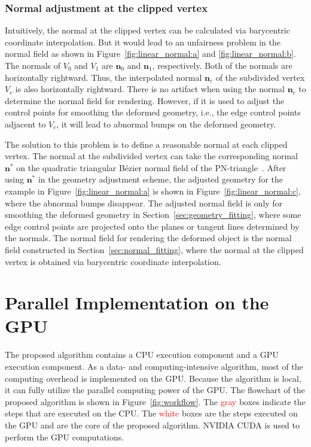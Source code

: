 \documentclass[3p]{elsarticle}
\begin{document}
\subsubsection{Normal adjustment at the clipped vertex}
\label{sec:normal_adjustment}

Intuitively, the normal at the clipped vertex can be calculated via barycentric coordinate interpolation. But it would
lead to an unfairness problem in the normal field as shown in Figure~\ref{fig:linear_normal:a} and
\ref{fig:linear_normal:b}. The normals of $V_0$ and $V_1$ are $\mathbf n_0$ and $\mathbf n_1$, respectively. Both of the
normals are horizontally rightward. Thus, the interpolated normal $\mathbf n_c$ of the subdivided vertex $V_c$ is also
horizontally rightward. There is no artifact when using the normal $\mathbf n_c$ to determine the normal field for
rendering. However, if it is used to adjust the control points for smoothing the deformed geometry, i.e., the edge
control points adjacent to $V_c$, it will lead to abnormal bumps on the deformed geometry.

The solution to this problem is to define a reasonable normal at each clipped vertex. The normal at the subdivided
vertex can take the corresponding normal $\mathbf n^*$ on the quadratic triangular B\'ezier normal field of the
PN-triangle~\cite{Vlachos01}. After using $\mathbf n^*$ in the geometry adjustment scheme, the adjusted geometry for the
example in Figure~\ref{fig:linear_normal:a} is shown in Figure~\ref{fig:linear_normal:c}, where the abnormal bumps
disappear. The adjusted normal field is only for smoothing the deformed geometry in Section~\ref{sec:geometry_fitting},
where some edge control points are projected onto the planes or tangent lines determined by the normals. The normal
field for rendering the deformed object is the normal field constructed in Section~\ref{sec:normal_fitting}, where the
normal at the clipped vertex is obtained via barycentric coordinate interpolation.


\section{Parallel Implementation on the GPU}

The proposed algorithm contains a CPU execution component and a GPU execution component. As a data- and
computing-intensive algorithm, most of the computing overhead is implemented on the GPU. Because the algorithm is local,
it can fully utilize the parallel computing power of the GPU. The flowchart of the proposed algorithm is shown in
Figure~\ref{fig:workflow}. The \textcolor{red}{gray} boxes indicate the steps that are executed on the CPU. The
\textcolor{red}{white} boxes are the steps executed on the GPU and are the core of the proposed algorithm. NVIDIA CUDA
is used to perform the GPU computations.
\end{document}
